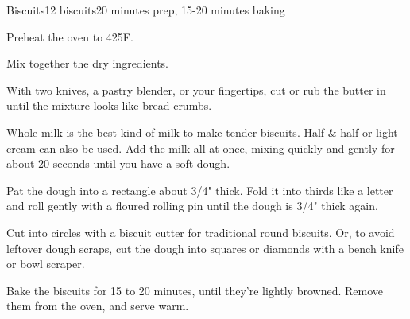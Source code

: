 \documentclass[../Cookbook.tex]{subfiles}
\begin{document}
\begin{recipe}{Biscuits}{12 biscuits}{20 minutes prep, 15-20 minutes baking}

Preheat the oven to 425\0F.


Mix together the dry ingredients.

With two knives, a pastry blender, or your fingertips, cut or rub the butter in until the mixture looks like bread crumbs.

Whole milk is the best kind of milk to make tender biscuits. Half \& half or light cream can also be used.
Add the milk all at once, mixing quickly and gently for about 20 seconds until you have a soft dough.

Pat the dough into a rectangle about 3/4" thick. Fold it into thirds like a letter and roll gently with a floured rolling pin until the dough is 3/4" thick again.

Cut into circles with a biscuit cutter for traditional round biscuits. Or, to avoid leftover dough scraps, cut the dough into squares or diamonds with a bench knife or bowl scraper.

Bake the biscuits for 15 to 20 minutes, until they're lightly browned. Remove them from the oven, and serve warm.


\end{recipe}
\end{document}
